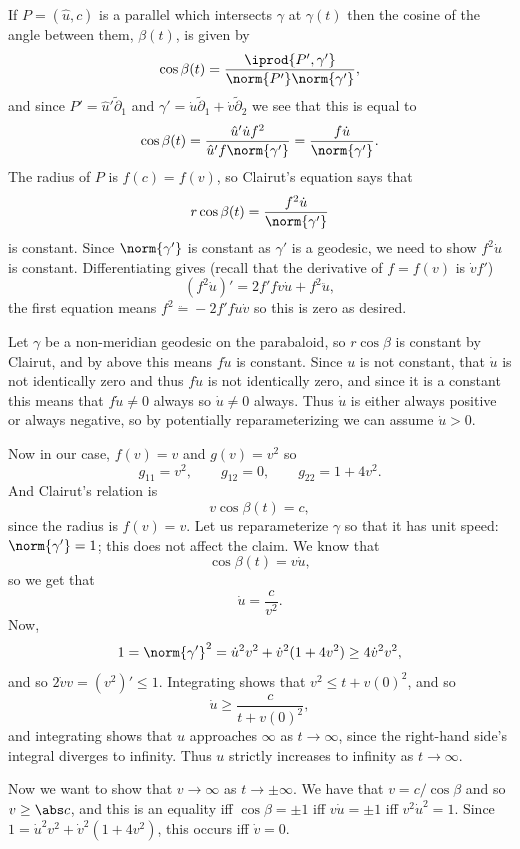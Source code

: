     If $P=(\hat u,c)$ is a parallel which intersects $\gamma$ at $\gamma(t)$ then the cosine of the angle between them, $\beta(t)$, is given by
    $$ \cos\beta(t) = \frac{\iprod{P',\gamma'}}{\norm{P'}\norm{\gamma'}} , $$
    and since $P'=\hat u'\tilde\partial_1$ and $\gamma'=\dot u\tilde\partial_1+\dot v\tilde\partial_2$ we see that this is equal to
    $$ \cos\beta(t) = \frac{\hat u'\dot u f^2}{\hat u'f\norm{\gamma'}} = \frac{f\dot u}{\norm{\gamma'}} . $$
    The radius of $P$ is $f(c)=f(v)$, so Clairut's equation says that
    $$ r\cos\beta(t) = \frac{f^2\dot u}{\norm{\gamma'}} $$
    is constant.
    Since $\norm{\gamma'}$ is constant as $\gamma'$ is a geodesic, we need to show $f^2\dot u$ is constant.
    Differentiating gives (recall that the derivative of $f=f(v)$ is $\dot vf'$)
    $$ (f^2\dot u)' = 2f'f\dot v\dot u + f^2\ddot u , $$
    the first equation means $f^2\ddot=-2f'f\dot u\dot v$ so this is zero as desired.

    \item Let $\gamma$ be a non-meridian geodesic on the parabaloid, so $r\cos\beta$ is constant by Clairut, and by above this means $f\dot u$ is constant.
    Since $u$ is not constant, that $\dot u$ is not identically zero and thus $f\dot u$ is not identically zero, and since it is a constant this means that $f\dot u\neq0$
    always so $\dot u\neq0$ always.
    Thus $\dot u$ is either always positive or always negative, so by potentially reparameterizing we can assume $\dot u>0$.

    Now in our case, $f(v)=v$ and $g(v)=v^2$ so
    $$ g_{11} = v^2,\qquad g_{12} = 0,\qquad g_{22} = 1 + 4v^2 . $$
    And Clairut's relation is
    $$ v\cos\beta(t) = c , $$
    since the radius is $f(v)=v$.
    Let us reparameterize $\gamma$ so that it has unit speed: $\norm{\gamma'}=1$; this does not affect the claim.
    We know that
    $$ \cos\beta(t) = v\dot u , $$
    so we get that
    $$ \dot u = \frac c{v^2} . $$
    Now,
    $$ 1 = \norm{\gamma'}^2 = \dot u^2v^2 + \dot v^2(1+4v^2) \geq 4\dot v^2v^2 , $$
    and so $2\dot vv=(v^2)'\leq1$.
    Integrating shows that $v^2\leq t+v(0)^2$, and so
    $$ \dot u \geq \frac c{t+v(0)^2} , $$
    and integrating shows that $u$ approaches $\infty$ as $t\to\infty$, since the right-hand side's integral diverges to infinity.
    Thus $u$ strictly increases to infinity as $t\to\infty$.

    Now we want to show that $v\to\infty$ as $t\to\pm\infty$.
    We have that $v=c/\cos\beta$ and so $v\geq\abs c$, and this is an equality iff $\cos\beta=\pm1$ iff $v\dot u=\pm1$ iff $v^2\dot u^2=1$.
    Since $1=\dot u^2v^2+\dot v^2(1+4v^2)$, this occurs iff $\dot v=0$.

